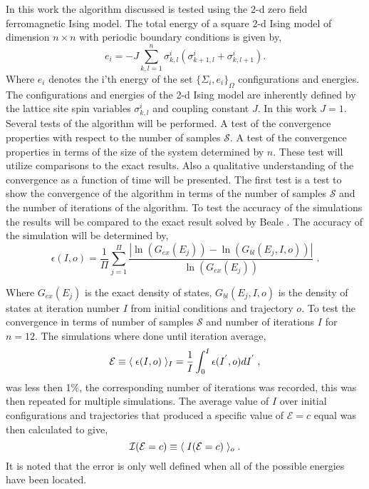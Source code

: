 \documentclass[twocolumn]{article}
\begin{document}
In this work the algorithm discussed is tested using the 2-d zero field ferromagnetic Ising model. The total energy of a square 2-d Ising model of dimension  $n\times n$ with periodic boundary conditions is given by, 
\begin{equation}
e_i = -J\sum_{k,l =1}^n \sigma^i_{k,l} 
\left( \sigma^i_{k+1,l} + \sigma^i_{k,l+1}
\right). \label{2D}
\end{equation}
Where $e_i$ denotes the i'th energy of the set  $\{\Sigma_i, e_i \}_{\Omega} $ configurations and energies. The configurations and energies of the 2-d Ising model are inherently defined by the lattice site spin variables $\sigma^i_{k,l}$ and coupling constant $J$. In this work $J=1$. Several tests of the algorithm will be performed. A test of the convergence properties with respect to the number of samples $\mathcal{S}$. A test of the convergence properties in terms of the size of the system determined by $n$. These test will utilize comparisons to the exact results. Also a qualitative understanding of the convergence as a function of time will be presented. 
The first test is a test to show the convergence of the algorithm in terms of the number of samples $\mathcal{S}$ and the number of iterations of the algorithm. To test the accuracy of the simulations the results will be compared to the exact result solved by Beale \cite{Beale_2d_ising}. The accuracy of the simulation will be determined by, 
\begin{equation}
\epsilon(I,o)  = \frac{1}{\Pi} \sum_{j=1}^{\Pi}\frac{|\ln(G_{ex}(E_j))- \ln(G_{bl}(E_j,I,o))|}{\ln(G_{ex}(E_j))}\; . 
\end{equation}

Where $G_{ex}(E_j)$ is the exact density of states, $G_{bl}(E_j,I,o)$ is the density of states at iteration number $I$ from initial conditions and trajectory $o$.
To test the convergence in terms of number of samples $\mathcal{S}$ and number of iterations $I$ for $n=12$.  The simulations where done until iteration average,
\begin{equation}
\mathcal{E} \equiv \langle \hspace{0.1cm} \epsilon(I,o)\hspace{0.1cm}\rangle_{I} = \frac{1}{I}\int_{0}^{I}\epsilon(I^{'},o)dI^{'} \;,
\end{equation}
 was less then 1$\%$, the corresponding number of iterations was recorded, this was then repeated for multiple simulations. The average value of $I$ over initial configurations and trajectories that produced a specific  value of $\mathcal{E}=c$ equal  was then calculated to give, 
\begin{equation}
 \mathcal{I}(\mathcal{E}=c) \equiv \langle \hspace{0.1cm}  I(\mathcal{E} = c) \hspace{0.1cm}\rangle_{o} \;.
 \end{equation}
 It is noted that the error is only well defined when all of the possible
 energies have been located. 

 


\end{document}

